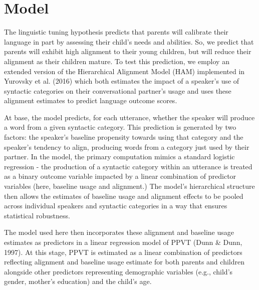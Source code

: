 \documentclass[10pt, letterpaper]{article}
\begin{document}
\hypertarget{model}{%
\section{Model}\label{model}}

The linguistic tuning hypothesis predicts that parents will calibrate
their language in part by assessing their child's needs and abilities.
So, we predict that parents will exhibit high alignment to their young
children, but will reduce their alignment as their children mature. To
test this prediction, we employ an extended version of the Hierarchical
Alignment Model (HAM) implemented in Yurovsky et al. (2016) which both
estimates the impact of a speaker's use of syntactic categories on their
conversational partner's usage and uses these alignment estimates to
predict language outcome scores.

At base, the model predicts, for each utterance, whether the speaker
will produce a word from a given syntactic category. This prediction is
generated by two factors: the speaker's baseline propensity towards
using that category and the speaker's tendency to align, producing words
from a category just used by their partner. In the model, the primary
computation mimics a standard logistic regression - the production of a
syntactic category within an utterance is treated as a binary outcome
variable impacted by a linear combination of predictor variables (here,
baseline usage and alignment.) The model's hierarchical structure then
allows the estimates of baseline usage and alignment effects to be
pooled across individual speakers and syntactic categories in a way that
ensures statistical robustness.

The model used here then incorporates these alignment and baseline usage
estimates as predictors in a linear regression model of PPVT (Dunn \&
Dunn, 1997). At this stage, PPVT is estimated as a linear combination of
predictors reflecting alignment and baseline usage estimate for both
parents and children alongside other predictors representing demographic
variables (e.g., child's gender, mother's education) and the child's
age.
\end{document}
